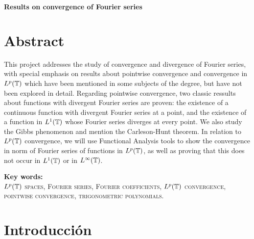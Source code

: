 \documentclass[a4paper, 12pt]{book}
\begin{document}


{
\cleardoublepage    
\let\cleardoublepage\relax

{\Large \textbf{Results on convergence of Fourier series}}\\

\chapter*{Abstract}}

This project addresses the study of convergence and divergence of Fourier series, with special emphasis on results about pointwise convergence and convergence in $L^p(\mathbb T)$ which have been mentioned in some subjects of the degree, but have not been explored in detail. Regarding pointwise convergence, two classic ressults about functions with divergent Fourier series are proven: the existence of a continuous function with divergent Fourier series at a point, and the existence of a function in $L^1(\mathbb T)$ whose Fourier series diverges at every point. We also study the Gibbs phenomenon and mention the Carleson-Hunt theorem. In relation to $L^p(\mathbb T)$ convergence, we will use Functional Analysis tools to show the convergence in norm of Fourier series of functions in $L^p(\mathbb T)$, as well as proving that this does not occur in $L^1(\mathbb T)$ or in $L^\infty(\mathbb T)$.

\vfill

\textbf{Key words:}\\

\textsc{$L^p(\mathbb T)$ spaces, Fourier series, Fourier coefficients, $L^p(\mathbb T)$ convergence, pointwise convergence, trigonometric polynomials}.



\chapter*{Introducción}
\end{document}
